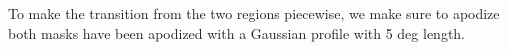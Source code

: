 To make the transition from the two regions piecewise, we make sure to apodize both masks have been apodized with a Gaussian profile with 5 deg length.






